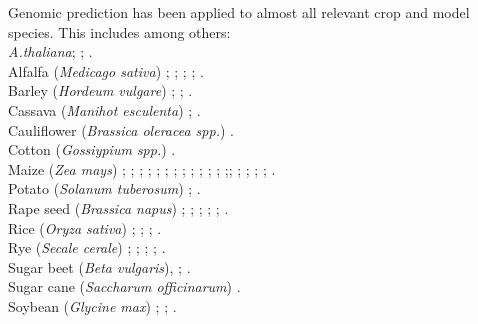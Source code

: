 Genomic prediction has been applied to almost all relevant crop and model species. This
includes among others: \\
\textit{A.thaliana}; \cite{shen2013novel}; \cite{hu2015}.\\
Alfalfa (\textit{Medicago sativa}) \cite{li2012applied}; \cite{annicchiarico2015accuracy}; \cite{li2015genomical}; \cite{biazzi2017genome}; \cite{hawkins2018recent}. \\
Barley (\textit{Hordeum vulgare}) \cite{zhong2009factors}; \cite{oakey2016}; \cite{neyhart2019}. \\
Cassava (\textit{Manihot esculenta}) \cite{elias2018}; \cite{elias2018improving}.\\
Cauliflower (\textit{Brassica oleracea spp.}) \cite{thorwarth2018genomic}.\\
Cotton (\textit{Gossiypium spp.}) \cite{gapare2018}.\\
Maize (\textit{Zea mays}) \cite{rincent2012}; \cite{windhausen2012};
\cite{technow2013genomic}; \cite{riedelsheimer2013genomic}; \cite{guo2013accuracy};
\cite{peiffer2014genetic}; \cite{technow2014genome}; \cite{lehermeier2014usefulness};
\cite{owens2014foundation}; \cite{montesinos2015threshold}; \cite{bustos2016improvement};
\cite{kadam2016genomic}; \cite{schopp2017accuracy};\cite{schopp2017genomic};
\cite{e2017genomic}; \cite{brauner2018genomic};
\cite{schrag2018beyond}; \cite{moeinizade2019}; \cite{allier2019usefulness}. \\
Potato (\textit{Solanum tuberosum}) \cite{enciso2018genomic}; \cite{Endelman2018pot}.\\
Rape seed (\textit{Brassica napus}) \cite{snowdon2012potential}; \cite{wurschum2014potential}; \cite{qian2014sub}; \cite{jan2016genomic}; \cite{luo2017genomic}; \cite{werner2018effective}.\\
Rice (\textit{Oryza sativa})  \cite{Xu2013rice}; \cite{Grenier2015}; \cite{BenHassen2018}; \cite{Momen2019}. \\
Rye (\textit{Secale cerale}) \cite{bernal2014importance}; \cite{wang2014accuracy};
\cite{auinger2016model}; \cite{marulanda2016optimum}; \cite{bernal2017genomic}.\\
Sugar beet (\textit{Beta vulgaris}), \cite{wurschum2013genomic}; \cite{biscarini2014genome}.\\
Sugar cane (\textit{Saccharum officinarum}) \cite{gouy2013experimental}.\\
Soybean (\textit{Glycine max}) \cite{Jarquin_2016}; \cite{Xavier_2016}; \cite{Stewart_Brown_2019}.\\
